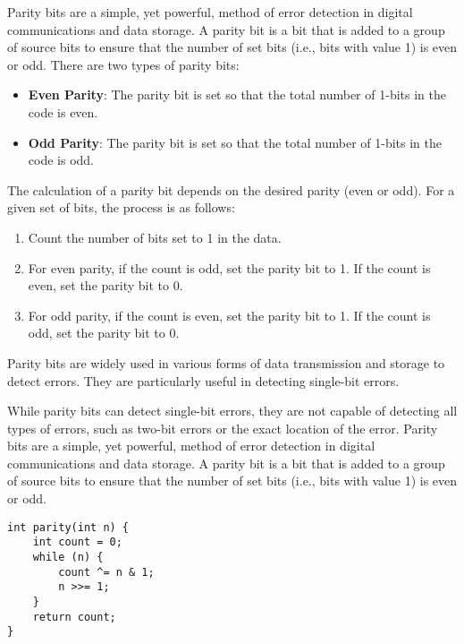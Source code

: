 \begin{note}
Parity bits are a simple, yet powerful, method of error detection in digital communications and data storage. A parity bit is a bit that is added to a group of source bits to ensure that the number of set bits (i.e., bits with value 1) is even or odd.
There are two types of parity bits:
\begin{itemize}
	\item \textbf{Even Parity}: The parity bit is set so that the total number of 1-bits in the code is even.
	\item \textbf{Odd Parity}: The parity bit is set so that the total number of 1-bits in the code is odd.
\end{itemize}
The calculation of a parity bit depends on the desired parity (even or odd). For a given set of bits, the process is as follows:
\begin{enumerate}
	\item Count the number of bits set to 1 in the data.
	\item For even parity, if the count is odd, set the parity bit to 1. If the count is even, set the parity bit to 0.
	\item For odd parity, if the count is even, set the parity bit to 1. If the count is odd, set the parity bit to 0.
\end{enumerate}
Parity bits are widely used in various forms of data transmission and storage to detect errors. They are particularly useful in detecting single-bit errors.

While parity bits can detect single-bit errors, they are not capable of detecting all types of errors, such as two-bit errors or the exact location of the error.
Parity bits are a simple, yet powerful, method of error detection in digital communications and data storage. A parity bit is a bit that is added to a group of source bits to ensure that the number of set bits (i.e., bits with value 1) is even or odd. 
\end{note}

\begin{lstlisting}[style=C]
int parity(int n) {
	int count = 0;
	while (n) {
		count ^= n & 1;
		n >>= 1;
	}
	return count;
}
\end{lstlisting}

